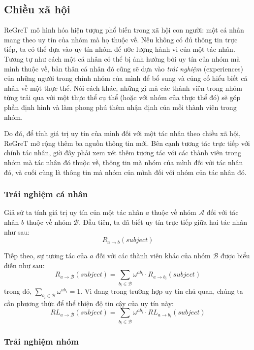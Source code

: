 \subsection{Chiều xã hội}

ReGreT mô hình hóa hiện tượng phổ biến trong xã hội con người: một cá nhân mang theo uy tín của nhóm mà họ thuộc về.
Nếu không có đủ thông tin trực tiếp, ta có thể dựa vào uy tín nhóm để ước lượng hành vi của một tác nhân.
Tương tự như cách một cá nhân có thể bị ảnh hưởng bởi uy tín của nhóm mà mình thuộc về, bản thân cá nhân đó cũng sẽ dựa vào \textit{trải nghiệm} (experiences)
của những người trong chính nhóm của mình để bổ sung và củng cố hiểu biết cá nhân về một thực thể.
Nói cách khác, những gì mà các thành viên trong nhóm từng trải qua với một thực thể cụ thể (hoặc với nhóm của thực thể đó) sẽ góp phần định hình
và làm phong phú thêm nhận định của mỗi thành viên trong nhóm.

Do đó, để tính giá trị uy tín của mình đối với một tác nhân theo chiều xã hội, ReGreT mở rộng thêm ba nguồn thông tin mới. Bên cạnh tương tác trực tiếp với chính tác nhân, giờ đây phải xem xét thêm
tương tác với các thành viên trong nhóm mà tác nhân đó thuộc về, thông tin mà nhóm của mình đối với tác nhân đó, và cuối cùng là thông tin mà nhóm của mình đối với nhóm của tác nhân đó.

\subsubsection{Trải nghiệm cá nhân}

Giả sử ta tính giá trị uy tín của một tác nhân $a$ thuộc về nhóm $\mathcal{A}$ đối với tác nhân $b$ thuộc về nhóm $\mathcal{B}$.
Đầu tiên, ta đã biết uy tín trực tiếp giữa hai tác nhân như sau:
\[R_{a \rightarrow b}(subject)\]

Tiếp theo, sự tương tác của $a$ đối với các thành viên khác của nhóm $\mathcal{B}$ được biểu diễn như sau:
\[R_{a \rightarrow \mathcal{B}}(subject)=\sum_{b_i \in \mathcal{B}} \omega^{ab_i} \cdot R_{a \rightarrow b_i}(subject)\]
trong đó, $\sum_{b_i \in \mathcal{B}} \omega^{ab_i} = 1$. Vì đang trong trường hợp uy tín chủ quan, chúng ta cần
phương thức để thể thiện độ tin cậy của uy tín này:
\[RL_{a \rightarrow \mathcal{B}}(subject)=\sum_{b_i \in \mathcal{B}} \omega^{ab_i} \cdot RL_{a \rightarrow b_i}(subject)\]

\subsubsection{Trải nghiệm nhóm}

